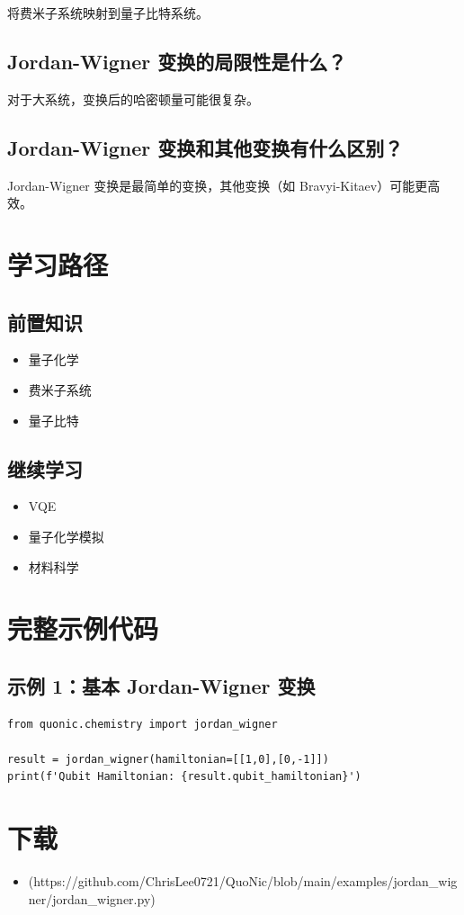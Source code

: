 \documentclass[12pt,a4paper]{article}
\begin{document}
将费米子系统映射到量子比特系统。

\subsection{Jordan-Wigner 变换的局限性是什么？}

对于大系统，变换后的哈密顿量可能很复杂。

\subsection{Jordan-Wigner 变换和其他变换有什么区别？}

Jordan-Wigner 变换是最简单的变换，其他变换（如 Bravyi-Kitaev）可能更高效。

\section{学习路径}

\subsection{前置知识}
\begin{itemize}
  \item 量子化学
  \item 费米子系统
  \item 量子比特
\end{itemize}

\subsection{继续学习}
\begin{itemize}
  \item VQE
  \item 量子化学模拟
  \item 材料科学
\end{itemize}

\section{完整示例代码}

\subsection{示例 1：基本 Jordan-Wigner 变换}

\begin{verbatim}
from quonic.chemistry import jordan_wigner

result = jordan_wigner(hamiltonian=[[1,0],[0,-1]])
print(f'Qubit Hamiltonian: {result.qubit_hamiltonian}')
\end{verbatim}

\section{下载}

\begin{itemize}
  \item [jordan\_wigner.py](https://github.com/ChrisLee0721/QuoNic/blob/main/examples/jordan_wigner/jordan_wigner.py)
\end{itemize}
\end{document}
